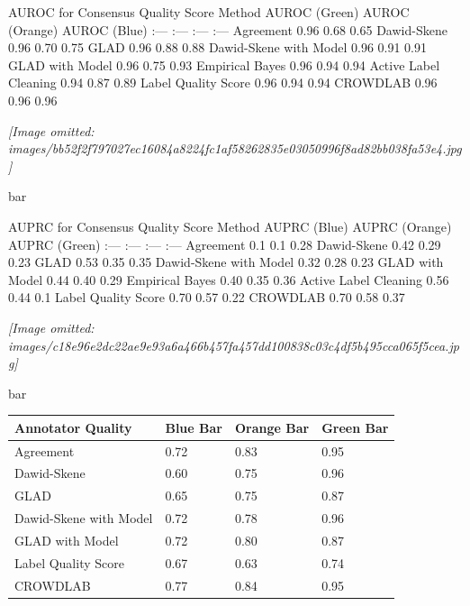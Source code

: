 \documentclass[
]{article}
\newcounter{none} %
\begin{document}
AUROC for Consensus Quality Score \textbar{} Method \textbar{} AUROC
(Green) \textbar{} AUROC (Orange) \textbar{} AUROC (Blue) \textbar{}
\textbar{} :--- \textbar{} :--- \textbar{} :--- \textbar{} :---
\textbar{} \textbar{} Agreement \textbar{} 0.96 \textbar{} 0.68
\textbar{} 0.65 \textbar{} \textbar{} Dawid-Skene \textbar{} 0.96
\textbar{} 0.70 \textbar{} 0.75 \textbar{} \textbar{} GLAD \textbar{}
0.96 \textbar{} 0.88 \textbar{} 0.88 \textbar{} \textbar{} Dawid-Skene
with Model \textbar{} 0.96 \textbar{} 0.91 \textbar{} 0.91 \textbar{}
\textbar{} GLAD with Model \textbar{} 0.96 \textbar{} 0.75 \textbar{}
0.93 \textbar{} \textbar{} Empirical Bayes \textbar{} 0.96 \textbar{}
0.94 \textbar{} 0.94 \textbar{} \textbar{} Active Label Cleaning
\textbar{} 0.94 \textbar{} 0.87 \textbar{} 0.89 \textbar{} \textbar{}
Label Quality Score \textbar{} 0.96 \textbar{} 0.94 \textbar{} 0.94
\textbar{} \textbar{} CROWDLAB \textbar{} 0.96 \textbar{} 0.96
\textbar{} 0.96 \textbar{}

\textit{[Image omitted: images/bb52f2f797027ec16084a8224fc1af58262835e03050996f8ad82bb038fa53e4.jpg]}

bar

AUPRC for Consensus Quality Score \textbar{} Method \textbar{} AUPRC
(Blue) \textbar{} AUPRC (Orange) \textbar{} AUPRC (Green) \textbar{}
\textbar{} :--- \textbar{} :--- \textbar{} :--- \textbar{} :---
\textbar{} \textbar{} Agreement \textbar{} 0.1 \textbar{} 0.1 \textbar{}
0.28 \textbar{} \textbar{} Dawid-Skene \textbar{} 0.42 \textbar{} 0.29
\textbar{} 0.23 \textbar{} \textbar{} GLAD \textbar{} 0.53 \textbar{}
0.35 \textbar{} 0.35 \textbar{} \textbar{} Dawid-Skene with Model
\textbar{} 0.32 \textbar{} 0.28 \textbar{} 0.23 \textbar{} \textbar{}
GLAD with Model \textbar{} 0.44 \textbar{} 0.40 \textbar{} 0.29
\textbar{} \textbar{} Empirical Bayes \textbar{} 0.40 \textbar{} 0.35
\textbar{} 0.36 \textbar{} \textbar{} Active Label Cleaning \textbar{}
0.56 \textbar{} 0.44 \textbar{} 0.1 \textbar{} \textbar{} Label Quality
Score \textbar{} 0.70 \textbar{} 0.57 \textbar{} 0.22 \textbar{}
\textbar{} CROWDLAB \textbar{} 0.70 \textbar{} 0.58 \textbar{} 0.37
\textbar{}

\textit{[Image omitted: images/c18e96e2dc22ae9e93a6a466b457fa457dd100838c03c4df5b495cca065f5cea.jpg]}

bar

{\def\LTcaptype{none} %
\begin{longtable}[]{@{}llll@{}}
\toprule\noalign{}
Annotator Quality & Blue Bar & Orange Bar & Green Bar \\
\midrule\noalign{}
\endhead
\bottomrule\noalign{}
\endlastfoot
Agreement & 0.72 & 0.83 & 0.95 \\
Dawid-Skene & 0.60 & 0.75 & 0.96 \\
GLAD & 0.65 & 0.75 & 0.87 \\
Dawid-Skene with Model & 0.72 & 0.78 & 0.96 \\
GLAD with Model & 0.72 & 0.80 & 0.87 \\
Label Quality Score & 0.67 & 0.63 & 0.74 \\
CROWDLAB & 0.77 & 0.84 & 0.95 \\
\end{longtable}
}
\end{document}
